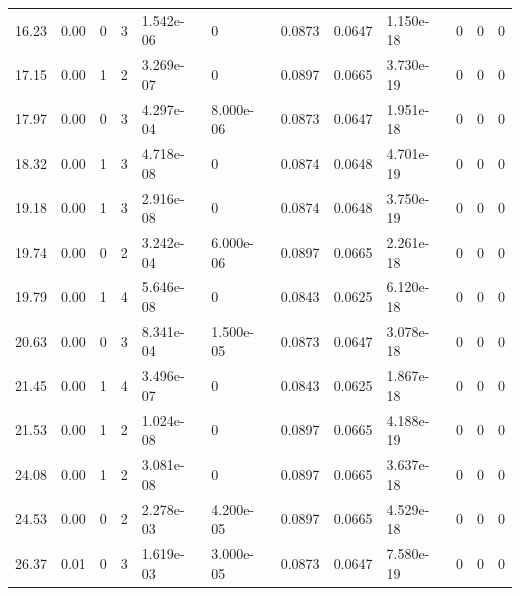 \documentclass[preview]{standalone}
\begin{document}
{{\begin{tabular}{L{1.2cm}C{1.2cm} C{0.3cm}C{0.5cm} C{1.4cm}C{1.4cm} C{1.4cm}C{1.4cm} C{1.6cm}C{1.6cm} C{1.6cm}C{1.6cm}}
  16.23  &  0.00  & 0     &  3 &  1.542e-06  & 0  &  0.0873&   0.0647& 1.150e-18 & 0   &  0 & 0  \\ 
  17.15  &  0.00  & 1     &  2 &  3.269e-07  & 0  &  0.0897&   0.0665& 3.730e-19 & 0   &  0 & 0  \\ 
  17.97  &  0.00  & 0     &  3 &  4.297e-04  & 8.000e-06  &  0.0873&   0.0647& 1.951e-18 & 0   &  0 & 0  \\ 
  18.32  &  0.00  & 1     &  3 &  4.718e-08  & 0  &  0.0874&   0.0648& 4.701e-19 & 0   &  0 & 0  \\ 
  19.18  &  0.00  & 1     &  3 &  2.916e-08  & 0  &  0.0874&   0.0648& 3.750e-19 & 0   &  0 & 0  \\ 
  19.74  &  0.00  & 0     &  2 &  3.242e-04  & 6.000e-06  &  0.0897&   0.0665& 2.261e-18 & 0   &  0 & 0  \\ 
  19.79  &  0.00  & 1     &  4 &  5.646e-08  & 0  &  0.0843&   0.0625& 6.120e-18 & 0   &  0 & 0  \\ 
  20.63  &  0.00  & 0     &  3 &  8.341e-04  & 1.500e-05  &  0.0873&   0.0647& 3.078e-18 & 0   &  0 & 0  \\ 
  21.45  &  0.00  & 1     &  4 &  3.496e-07  & 0  &  0.0843&   0.0625& 1.867e-18 & 0   &  0 & 0  \\ 
  21.53  &  0.00  & 1     &  2 &  1.024e-08  & 0  &  0.0897&   0.0665& 4.188e-19 & 0   &  0 & 0  \\ 
  24.08  &  0.00  & 1     &  2 &  3.081e-08  & 0  &  0.0897&   0.0665& 3.637e-18 & 0   &  0 & 0  \\ 
  24.53  &  0.00  & 0     &  2 &  2.278e-03  & 4.200e-05  &  0.0897&   0.0665& 4.529e-18 & 0   &  0 & 0  \\ 
  26.37  &  0.01  & 0     &  3 &  1.619e-03  & 3.000e-05  &  0.0873&   0.0647& 7.580e-19 & 0   &  0 & 0  \\ 
\hline 
\end{tabular} 

}}
\end{document}
